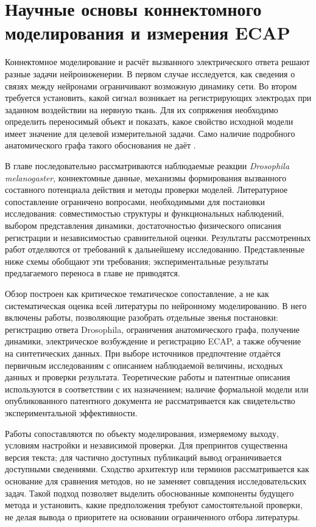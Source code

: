 \chapter{Научные основы коннектомного моделирования и измерения ECAP}
\label{chap:foundations}

Коннектомное моделирование и расчёт вызванного электрического ответа решают разные задачи нейроинженерии. В первом случае исследуется, как сведения о связях между нейронами ограничивают возможную динамику сети. Во втором требуется установить, какой сигнал возникает на регистрирующих электродах при заданном воздействии на нервную ткань. Для их сопряжения необходимо определить переносимый объект и показать, какое свойство исходной модели имеет значение для целевой измерительной задачи. Само наличие подробного анатомического графа такого обоснования не даёт \cite{s743,s285}.

В главе последовательно рассматриваются наблюдаемые реакции \textit{Drosophila melanogaster}, коннектомные данные, механизмы формирования вызванного составного потенциала действия и методы проверки моделей. Литературное сопоставление ограничено вопросами, необходимыми для постановки исследования: совместимостью структуры и функциональных наблюдений, выбором представления динамики, достаточностью физического описания регистрации и независимостью сравнительной оценки. Результаты рассмотренных работ отделяются от требований к дальнейшему исследованию. Представленные ниже схемы обобщают эти требования; экспериментальные результаты предлагаемого переноса в главе не приводятся.

Обзор построен как критическое тематическое сопоставление, а не как систематическая оценка всей литературы по нейронному моделированию. В него включены работы, позволяющие разобрать отдельные звенья постановки: регистрацию ответа Drosophila, ограничения анатомического графа, получение динамики, электрическое возбуждение и регистрацию ECAP, а также обучение на синтетических данных. При выборе источников предпочтение отдаётся первичным исследованиям с описанием наблюдаемой величины, исходных данных и проверки результата. Теоретические работы и патентные описания используются в соответствии с их назначением; наличие формальной модели или опубликованного патентного документа не рассматривается как свидетельство экспериментальной эффективности.

Работы сопоставляются по объекту моделирования, измеряемому выходу, условиям настройки и независимой проверки. Для препринтов существенна версия текста; для частично доступных публикаций вывод ограничивается доступными сведениями. Сходство архитектур или терминов рассматривается как основание для сравнения методов, но не заменяет совпадения исследовательских задач. Такой подход позволяет выделить обоснованные компоненты будущего метода и установить, какие предположения требуют самостоятельной проверки, не делая вывода о приоритете на основании ограниченного отбора литературы.

